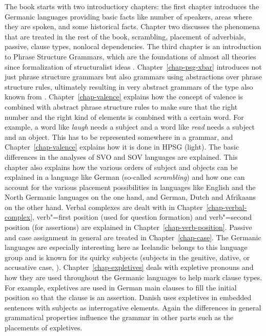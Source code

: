 The book starts with two introductiory chapters: the first chapter introduces the Germanic languages
providing basic facts like number of speakers, areas where they are spoken, and some historical
facts. Chapter two discusses the phenomena that are treated in the rest of the book, \eg scrambling,
placement of adverbials, passive, clause types, nonlocal dependencies. The third chapter is an
introduction to Phrase Structure Grammars, which are the foundations of almost all theories since
 formalization of structuralist ideas
\citep{Bloomfield33a-u}. Chapter~\ref{chap-psg-xbar} introduces not just phrase structure grammars
but also grammars using abstractions over phrase structure rules, ultimately resulting in very
abstract grammars of the type also known from \xbart
\citep{Jackendoff77a}. Chapter~\ref{chap-valence} explains how the concept of valence is combined
with abstract phrase structure rules to make sure that the right number and the right kind of
elements is combined with a certain word. For example, a word like \emph{laugh} needs a subject and
a word like \emph{read} needs a subject and an object. This has to be represented somewhere in a
grammar, and Chapter~\ref{chap-valence} explains how it is done in HPSG (light). The basic differences
in the analyses of SVO and SOV languages are explained. This chapter also
explains how the various orders of subject and objects can be explained in a language like German
(so-called \emph{scrambling}) and how one can account for the various placement possibilities in languages like English
and the North Germanic languages on the one hand, and German, Dutch and Afrikaans on the other hand. Verbal complexes are dealt with in Chapter~\ref{chap-verbal-complex}, verb"=first position (used for question formation) and verb"=second position (for assertions) are explained
in Chapter~\ref{chap-verb-position}. Passive and case assignment in general are treated in
Chapter~\ref{chap-case}. The Germanic languages are especially interesting here as Icelandic
belongs to this language group and is known for its quirky subjects (subjects in the genitive, dative, or
accusative case, \citealp{ZMT85a}). Chapter~\ref{chap-expletives} deals with expletive pronouns and how they are used
throughout the Germanic languages to help mark clause types. For example, expletives are used in
German main clauses to fill the initial position so that the clause is an assertion. Danish uses
expletives in embedded sentences with subjects as interrogative elements. Again the differences in
general grammatical properties influence the grammar in other parts such as the placements of expletives. 

